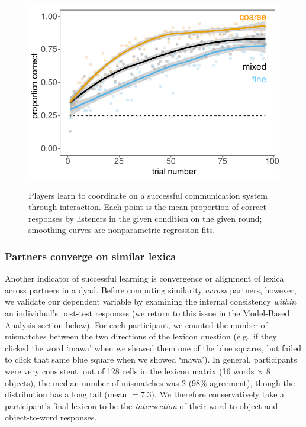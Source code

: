 \documentclass[10pt,letterpaper]{article}
\begin{document}
\begin{figure}[t]
\begin{center}
{\includegraphics[scale=0.65]{accuracyByCondition_edited.pdf}}
{\caption{{Players learn to coordinate on a successful communication system through interaction. Each point is the mean proportion of correct responses by listeners in the given condition on the given round; smoothing curves are nonparametric regression fits.  %
\label{fig:accuracy}}}}
\vspace{-.7cm}
\end{center}
\end{figure}

\subsubsection{Partners converge on similar lexica}

Another indicator of successful learning is convergence or alignment of lexica across partners in a dyad. Before computing similarity \emph{across} partners, however, we validate our dependent variable by examining the internal consistency \emph{within} an individual's post-test responses (we return to this issue in the Model-Based Analysis section below). For each participant, we counted the number of mismatches between the two directions of the lexicon question (e.g.\ if they clicked the word `mawa' when we showed them one of the blue squares, but failed to click that same blue square when we showed `mawa'). In general, participants were very consistent: out of 128 cells in the lexicon matrix (16 words $\times$ 8 objects), the median number of mismatches was 2 (98\% agreement), though the distribution has a long tail (mean $= 7.3$). We therefore conservatively take a participant's final lexicon to be the \emph{intersection} of their word-to-object and object-to-word responses.
\end{document}
